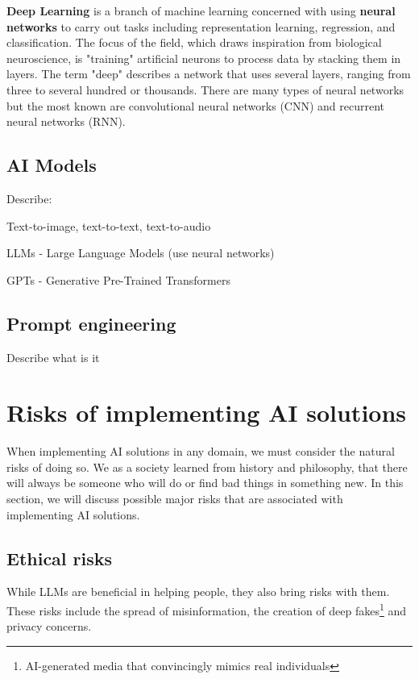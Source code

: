 \textbf{Deep Learning} is a branch of machine learning concerned with using \textbf{neural networks} to carry out tasks including representation learning, regression, and classification. The focus of the field, which draws inspiration from biological neuroscience, is "training" artificial neurons to process data by stacking them in layers. The term "deep" describes a network that uses several layers, ranging from three to several hundred or thousands\cite{LeCun2015}. There are many types of neural networks but the most known are convolutional neural networks (CNN) and recurrent neural networks (RNN).



\subsection{AI Models}
Describe:

Text-to-image, text-to-text, text-to-audio

LLMs - Large Language Models (use neural networks)

GPTs - Generative Pre-Trained Transformers

\subsection{Prompt engineering}
Describe what is it



\section{Risks of implementing AI solutions}
When implementing AI solutions in any domain, we must consider the natural risks of doing so. We as a society learned from history and philosophy, that there will always be someone who will do or find bad things in something new. In this section, we will discuss possible major risks that are associated with implementing AI solutions.

\subsection{Ethical risks}
While LLMs are beneficial in helping people, they also bring risks with them. These risks include the spread of misinformation, the creation of deep fakes\footnote{AI-generated media that convincingly mimics real individuals} and privacy concerns. 

